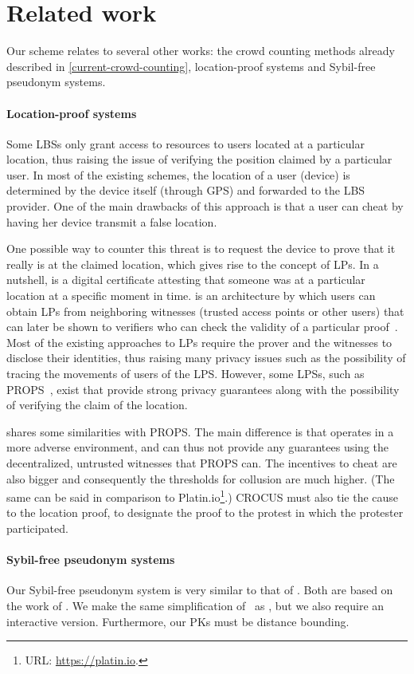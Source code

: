 \section{Related work}

Our scheme relates to several other works: the crowd counting methods already 
described in \cref{current-crowd-counting}, location-proof systems and 
Sybil-free pseudonym systems.

\paragraph*{Location-proof systems}%
\label{db-and-lp}

Some \acp{LBS} only grant access to resources to users located at a particular 
location, thus raising the issue of verifying the position claimed by a 
particular user.
In most of the existing schemes, the location of a user (device) is determined 
by the device itself (\eg through GPS) and forwarded to the \ac{LBS} provider.
One of the main drawbacks of this approach is that a user can cheat by having 
her device transmit a false location.

One possible way to counter this threat is to request the device to prove that 
it really is at the claimed location, which gives rise to the concept of 
\acp{LP}.
In a nutshell,  is a digital certificate attesting that someone was at 
a particular location at a specific moment in time.
 is an architecture by which users can obtain \acp{LP} from 
neighboring witnesses (\eg trusted access points or other users) that can later 
be shown to verifiers who can check the validity of a particular 
proof~\cite{luo2010veriplace,zhu2011applaus}.
Most of the existing approaches to \acp{LP} require the prover and the 
witnesses to disclose their identities, thus raising many privacy issues such 
as the possibility of tracing the movements of users of the \ac{LPS}.
However, some \acp{LPS}, such as PROPS~\cite{PROPS}, exist that provide strong 
privacy guarantees along with the possibility of verifying the claim of the 
location.

\CROCUS shares some similarities with PROPS\@.
The main difference is that \CROCUS operates in a more adverse environment, and 
can thus not provide any guarantees using the decentralized, untrusted 
witnesses that PROPS can.
The incentives to cheat are also bigger and consequently the thresholds for 
collusion are much higher.
(The same can be said in comparison to Platin.io\footnote{%
  URL: \url{https://platin.io}.
}.)
CROCUS must also tie the cause to the location proof, to designate the proof 
to the protest in which the protester participated.

\paragraph*{Sybil-free pseudonym systems}

Our Sybil-free pseudonym system is very similar to that of 
\textcite{SybilFreePseudonyms}.
Both are based on the work of \textcite{HowToWinTheCloneWars}.
We make the same simplification of~\cite{HowToWinTheCloneWars} as 
\textcite{SybilFreePseudonyms}, but we also require an interactive version.
Furthermore, our \acp{PK} must be distance bounding.
